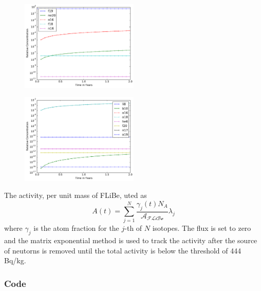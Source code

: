 \documentclass[12pt]{article}
\newenvironment{solnum}[2][Solution]{\begin{trivlist}
\item[\hskip \labelsep {\bfseries #1}\hskip \labelsep {\bfseries #2:}]\hspace{0.3in}\newline\newline}{\end{trivlist}}
\begin{document}
\begin{solnum}{1-2}
\begin{figure}
    \end{figure}
    \begin{figure}
        \centering
        \includegraphics[width=0.5\textwidth]{p2.pdf}
    \end{figure}
    \begin{figure}
        \centering
        \includegraphics[width=0.5\textwidth]{p3.pdf}
    \end{figure}
\end{solnum}

\begin{solnum}{1-3}
    The activity, per unit mass of FLiBe, uted as
    \begin{equation}
        A(t) = \sum_{j=1}^N \frac{\gamma_j(t)N_A}{\mathcal{A_{FLiBe}}}\lambda_j
    \end{equation}
    where $\gamma_j$ is the atom fraction for the $j$-th of $N$ isotopes. The flux is set to zero and the matrix exponential method is used to
    track the activity after the source of neutorns is removed until the total
    activity is below the threshold of 444 Bq/kg.

\end{solnum}

\clearpage
\subsubsection*{Code}

\end{document}
